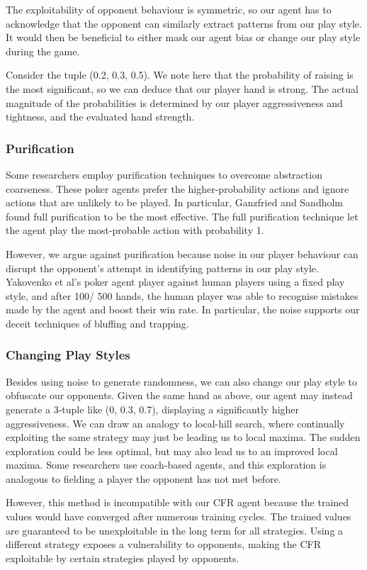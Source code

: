 \documentclass{article}
\begin{document}
The exploitability of opponent behaviour is symmetric, so our agent has to acknowledge that the opponent can similarly extract patterns from our play style. It would then be beneficial to either mask our agent bias or change our play style during the game.

Consider the tuple (0.2, 0.3, 0.5). We note here that the probability of raising is the most significant, so we can deduce that our player hand is strong. The actual magnitude of the probabilities is determined by our player aggressiveness and tightness, and the evaluated hand strength.

\subsubsection{Purification}

Some researchers employ purification techniques to overcome abstraction coarseness. These poker agents prefer the higher-probability actions and ignore actions that are unlikely to be played. In particular, Ganzfried and Sandholm found full purification to be the most effective. The full purification technique let the agent play the most-probable action with probability 1.

However, we argue against purification because noise in our player behaviour can disrupt the opponent's attempt in identifying patterns in our play style. Yakovenko et al's poker agent player against human players using a fixed play style, and after 100/ 500 hands, the human player was able to recognise mistakes made by the agent and boost their win rate. In particular, the noise supports our deceit techniques of bluffing and trapping.

\subsubsection{Changing Play Styles}
Besides using noise to generate randomness, we can also change our play style to obfuscate our opponents. Given the same hand as above, our agent may instead generate a 3-tuple like (0, 0.3, 0.7), displaying a significantly higher aggressiveness. We can draw an analogy to local-hill search, where continually exploiting the same strategy may just be leading us to local maxima. The sudden exploration could be less optimal, but may also lead us to an improved local maxima. Some researchers use coach-based agents, and this exploration is analogous to fielding a player the opponent has not met before.

However, this method is incompatible with our CFR agent because the trained values would have converged after numerous training cycles. The trained values are guaranteed to be unexploitable in the long term for all strategies. Using a different strategy exposes a vulnerability to opponents, making the CFR exploitable by certain strategies played by opponents.
\end{document}
